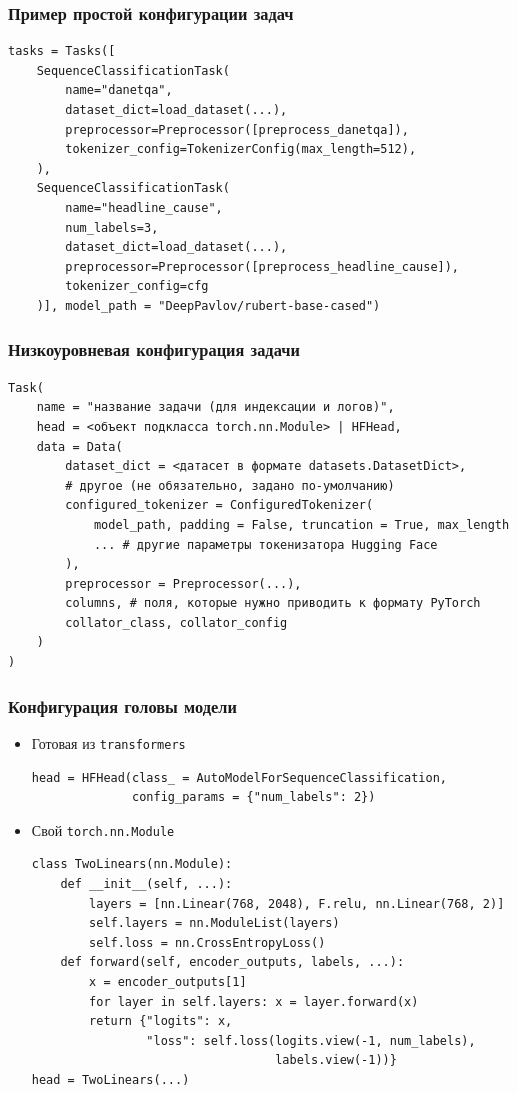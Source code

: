 \documentclass[aspectratio=169]{beamer}
\begin{document}
\begin{frame}[fragile]
	\frametitle{Пример простой конфигурации задач}
	\begin{verbatim}
tasks = Tasks([
	SequenceClassificationTask(
	    name="danetqa",
	    dataset_dict=load_dataset(...),
	    preprocessor=Preprocessor([preprocess_danetqa]),
	    tokenizer_config=TokenizerConfig(max_length=512),
	), 
	SequenceClassificationTask(
	    name="headline_cause",
	    num_labels=3,
	    dataset_dict=load_dataset(...),
	    preprocessor=Preprocessor([preprocess_headline_cause]),
	    tokenizer_config=cfg
	)], model_path = "DeepPavlov/rubert-base-cased")
	\end{verbatim}
\end{frame}

\begin{frame}[fragile]
	\frametitle{Низкоуровневая конфигурация задачи}
	\begin{verbatim}
Task(
    name = "название задачи (для индексации и логов)",
    head = <объект подкласса torch.nn.Module> | HFHead,
    data = Data(
        dataset_dict = <датасет в формате datasets.DatasetDict>,
        # другое (не обязательно, задано по-умолчанию)
        configured_tokenizer = ConfiguredTokenizer(
            model_path, padding = False, truncation = True, max_length
            ... # другие параметры токенизатора Hugging Face
        ),
        preprocessor = Preprocessor(...),
        columns, # поля, которые нужно приводить к формату PyTorch
        collator_class, collator_config
    )
)
	\end{verbatim}
\end{frame}

\begin{frame}[fragile]
	\frametitle{Конфигурация головы модели}
	\begin{itemize}
		\item Готовая из \texttt{transformers}
		\begin{verbatim}
head = HFHead(class_ = AutoModelForSequenceClassification,
              config_params = {"num_labels": 2})
		\end{verbatim}
		\item Свой \texttt{torch.nn.Module}
		\begin{verbatim}
class TwoLinears(nn.Module):
    def __init__(self, ...):
        layers = [nn.Linear(768, 2048), F.relu, nn.Linear(768, 2)]
        self.layers = nn.ModuleList(layers)
        self.loss = nn.CrossEntropyLoss()
    def forward(self, encoder_outputs, labels, ...):
        x = encoder_outputs[1]
        for layer in self.layers: x = layer.forward(x)
        return {"logits": x, 
                "loss": self.loss(logits.view(-1, num_labels), 
                                  labels.view(-1))}
head = TwoLinears(...)
		\end{verbatim}
	\end{itemize}
\end{frame}
\end{document}
